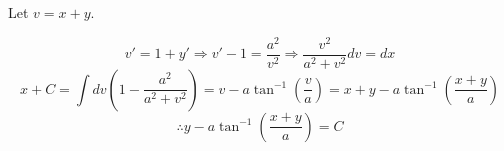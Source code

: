 \item

Let $v = x + y$.

\[
	v' = 1 + y'
	\Rightarrow v' - 1 = \frac{a^2}{v^2}
	\Rightarrow \frac{v^2}{a^2 + v^2} dv = dx
\]
\[
	x + C
	= \int dv \left( 1 - \frac{a^2}{a^2 + v^2} \right)
	= v - a \tan^{-1} \left( \frac{v}{a} \right)
	= x + y - a \tan^{-1} \left( \frac{x + y}{a} \right)
\]
\[
	\therefore y - a \tan^{-1} \left( \frac{x + y}{a} \right) = C
\]
